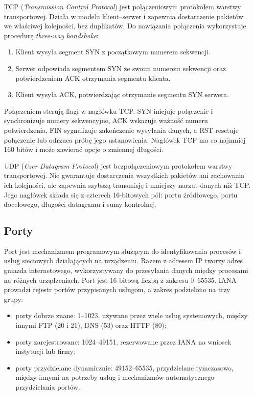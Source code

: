 \documentclass[11pt,a4paper]{article}
\begin{document}
TCP (\textit{Transmission Control Protocol}) jest połączeniowym protokołem
warstwy transportowej. Działa w modelu klient--serwer i zapewnia dostarczenie
pakietów we właściwej kolejności, bez duplikatów. Do nawiązania połączenia
wykorzystuje procedurę \textit{three-way handshake}:

\begin{enumerate}
    \item Klient wysyła segment SYN z początkowym numerem sekwencji.
    \item Serwer odpowiada segmentem SYN ze swoim numerem sekwencji oraz
    potwierdzeniem ACK otrzymania segmentu klienta.
    \item Klient wysyła ACK, potwierdzając otrzymanie segmentu SYN serwera.
\end{enumerate}

Połączeniem sterują flagi w nagłówku TCP. SYN inicjuje połączenie
i synchronizuje numery sekwencyjne, ACK wskazuje ważność numeru
potwierdzenia, FIN sygnalizuje zakończenie wysyłania danych, a RST resetuje
połączenie lub odrzuca próbę jego ustanowienia. Nagłówek TCP ma co najmniej
160 bitów i może zawierać opcje o zmiennej długości.

UDP (\textit{User Datagram Protocol}) jest bezpołączeniowym protokołem
warstwy transportowej. Nie gwarantuje dostarczenia wszystkich pakietów ani
zachowania ich kolejności, ale zapewnia szybszą transmisję i mniejszy
narzut danych niż TCP. Jego nagłówek składa się z czterech 16-bitowych pól:
portu źródłowego, portu docelowego, długości datagramu i sumy kontrolnej.

\subsection*{Porty}

Port jest mechanizmem programowym służącym do identyfikowania procesów
i usług sieciowych działających na urządzeniu. Razem z adresem IP tworzy
adres gniazda internetowego, wykorzystywany do przesyłania danych między
procesami na różnych urządzeniach. Port jest 16-bitową liczbą z zakresu
0--65535. IANA prowadzi rejestr portów przypisanych usługom, a zakres
podzielono na trzy grupy:

\begin{itemize}
    \item porty dobrze znane: 1--1023, używane przez wiele usług systemowych,
    między innymi FTP (20 i 21), DNS (53) oraz HTTP (80);
    \item porty zarejestrowane: 1024--49151, rezerwowane przez IANA na
    wniosek instytucji lub firmy;
    \item porty przydzielane dynamicznie: 49152--65535, przydzielane
    tymczasowo, między innymi na potrzeby usług i mechanizmów automatycznego
    przydzielania portów.
\end{itemize}
\end{document}
